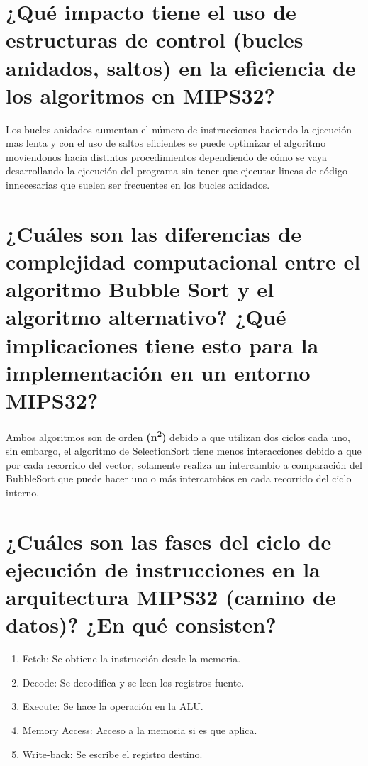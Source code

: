\documentclass[12pt]{article}
\begin{document}
\section{¿Qué impacto tiene el uso de estructuras de control (bucles anidados, saltos) en la 
eficiencia de los algoritmos en MIPS32?}
\begin{itemize}
    Los bucles anidados aumentan el número de instrucciones haciendo la ejecución mas lenta y con el uso de saltos eficientes se puede optimizar el algoritmo moviendonos hacia distintos procedimientos dependiendo de cómo se vaya desarrollando la ejecución del programa sin tener que ejecutar lineas de código innecesarias que suelen ser frecuentes en los bucles anidados.
\end{itemize}

\section{¿Cuáles son las diferencias de complejidad computacional entre el algoritmo Bubble Sort 
y el algoritmo alternativo? ¿Qué implicaciones tiene esto para la implementación en un 
entorno MIPS32?}
\begin{itemize}
    Ambos algoritmos son de orden \textbf{(n\textsuperscript{2})} debido a que utilizan dos ciclos cada uno, sin embargo, el algoritmo de SelectionSort tiene menos interacciones debido a que por cada recorrido del vector, solamente realiza un intercambio a comparación del BubbleSort que puede hacer uno o más intercambios en cada recorrido del ciclo interno.
\end{itemize} 

\section{¿Cuáles son las fases del ciclo de ejecución de instrucciones en la arquitectura MIPS32 
(camino de datos)? ¿En qué consisten?}
\begin{enumerate}
    \item Fetch: Se obtiene la instrucción desde la memoria.
    \item Decode: Se decodifica y se leen los registros fuente.
    \item Execute: Se hace la operación en la ALU.
    \item Memory Access: Acceso a la memoria si es que aplica.
    \item Write-back: Se escribe el registro destino.
\end{enumerate}
\end{document}
